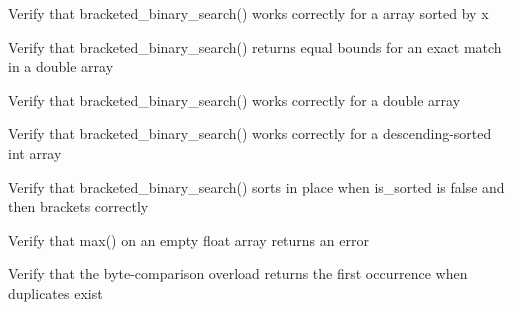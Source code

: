 \begin{DoxyRefList}
%
Verify that bracketed\+\_\+binary\+\_\+search() works correctly for a  array sorted by x  
\item[Global \doxylink{test__array_8cpp_ac59974032c9cccc37e2aa2ee050e9ba0}{TEST\+\_\+F} (\doxylink{classArrayInitTest}{Array\+Init\+Test}, Bracketed\+Binary\+Search\+Double\+Exact\+Match)]\label{test__test000210}%
%
Verify that bracketed\+\_\+binary\+\_\+search() returns equal bounds for an exact match in a double array  
\item[Global \doxylink{test__array_8cpp_adf42af29427ab11602f95df1f25ed3ce}{TEST\+\_\+F} (\doxylink{classArrayInitTest}{Array\+Init\+Test}, Bracketed\+Binary\+Search\+Double\+Value\+Between\+Elements)]\label{test__test000209}%
%
Verify that bracketed\+\_\+binary\+\_\+search() works correctly for a double array  
\item[Global \doxylink{test__array_8cpp_a45c01d99c3fd800547151c34e64190de}{TEST\+\_\+F} (\doxylink{classArrayInitTest}{Array\+Init\+Test}, Bracketed\+Binary\+Search\+Int\+Descending)]\label{test__test000208}%
%
Verify that bracketed\+\_\+binary\+\_\+search() works correctly for a descending-\/sorted int array  
\item[Global \doxylink{test__array_8cpp_a8c12885bf4a38b70a15794c4488a9b09}{TEST\+\_\+F} (\doxylink{classArrayInitTest}{Array\+Init\+Test}, Bracketed\+Binary\+Search\+Int\+Sorts\+In\+Place)]\label{test__test000207}%
%
Verify that bracketed\+\_\+binary\+\_\+search() sorts in place when is\+\_\+sorted is false and then brackets correctly  
\item[Global \doxylink{test__array_8cpp_ab9b3c911fd3628033b1d5bf50781e4f4}{TEST\+\_\+F} (\doxylink{classArrayInitTest}{Array\+Init\+Test}, Max\+Float\+Empty\+Array\+Returns\+Error)]\label{test__test000160}%
%
Verify that max() on an empty float array returns an error  
\item[Global \doxylink{test__array_8cpp_a7d64325f787ba7459c7ef2e6d61bbf3a}{TEST\+\_\+F} (\doxylink{classArrayInitTest}{Array\+Init\+Test}, Contains\+Byte\+Int\+Returns\+First\+Duplicate)]\label{test__test000169}%
%
Verify that the byte-\/comparison overload returns the first occurrence when duplicates exist  
\item[Global \doxylink{test__array_8cpp_a3c4011011533670b09e06b59bbd93e2d}{TEST\+\_\+F} (\doxylink{classArrayInitTest}{Array\+Init\+Test}, Contains\+Byte\+Int\+Finds\+Last\+Element)]\label{test__test000168}%

\end{DoxyRefList}
